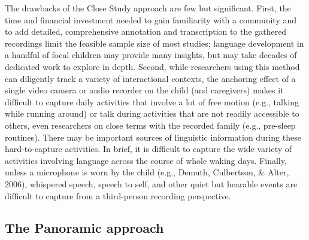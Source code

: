 \documentclass[,man,floatsintext]{apa6}
\begin{document}
The drawbacks of the Close Study approach are few but significant.
First, the time and financial investment needed to gain familiarity with
a community and to add detailed, comprehensive annotation and
transcription to the gathered recordings limit the feasible sample size
of most studies; language development in a handful of focal children may
provide many insights, but may take decades of dedicated work to explore
in depth. Second, while researchers using this method can diligently
track a variety of interactional contexts, the anchoring effect of a
single video camera or audio recorder on the child (and caregivers)
makes it difficult to capture daily activities that involve a lot of
free motion (e.g., talking while running around) or talk during
activities that are not readily accessible to others, even researchers
on close terms with the recorded family (e.g., pre-sleep routines).
There may be important sources of linguistic information during these
hard-to-capture activities. In brief, it is difficult to capture the
wide variety of activities involving language across the course of whole
waking days. Finally, unless a microphone is worn by the child (e.g.,
Demuth, Culbertson, \& Alter, 2006), whispered speech, speech to self,
and other quiet but hearable events are difficult to capture from a
third-person recording perspective.

\subsection{The Panoramic approach}\label{the-panoramic-approach}
\end{document}
